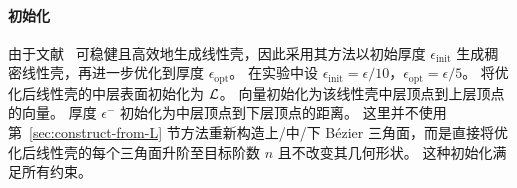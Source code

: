 \paragraph{初始化}
由于文献~\cite{Jiang2020BijectivePI} 可稳健且高效地生成线性壳，因此采用其方法以初始厚度 $\epsilon_\text{init}$ 生成稠密线性壳，再进一步优化到厚度 $\epsilon_\text{opt}$。
在实验中设 $\epsilon_\text{init} = \epsilon/10$，$\epsilon_\text{opt} = \epsilon/5$。
将优化后线性壳的中层表面初始化为 $\mathcal{L}$。
向量初始化为该线性壳中层顶点到上层顶点的向量。
厚度 $\epsilon^{-}$ 初始化为中层顶点到下层顶点的距离。
这里并不使用第~\ref{sec:construct-from-L} 节方法重新构造上/中/下 B\'{e}zier 三角面，而是直接将优化后线性壳的每个三角面升阶至目标阶数 $n$ 且不改变其几何形状。
这种初始化满足所有约束。

%
%

